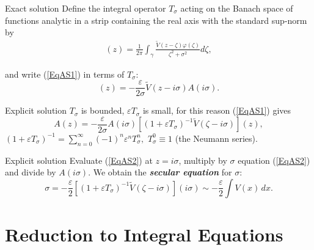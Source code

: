 \documentclass{beamer}
\begin{document}
\begin{frame}{Exact solution}
 Define the integral operator $T_\sigma$  acting on the Banach space of functions analytic in a strip containing the real axis with the standard sup-norm by
\begin{align*}
[T_\sigma \varphi(\zeta)](z)=\frac{1}{2\pi}\int_\gamma \frac{\tilde{V}(z-\zeta)\varphi(\zeta)}{\zeta^2+\sigma^2}d\zeta,
\end{align*}

 and write (\ref{EqAS1}) in terms of $T_\sigma$:
\begin{equation*} [(1+\varepsilon T_\sigma)A(\zeta)](z)=-\frac{\varepsilon}{2\sigma}\tilde{V}(z-i\sigma)A(i\sigma).\end{equation*}



\end{frame}

\begin{frame}{Explicit solution}
$T_\sigma$ is bounded,
$\varepsilon T_\sigma$ is small, for this reason (\ref{EqAS1}) gives
\begin{equation}\label{EqAS2}
A(z)=-\frac{\varepsilon}{2\sigma}A(i\sigma)[(1+\varepsilon T_{\sigma})^{-1}\tilde{V}(\zeta-i\sigma)](z),
\end{equation}
$(1+\varepsilon T_{\sigma})^{-1}=\sum_{n=0}^{\infty}(-1)^n\varepsilon^n T_\sigma^n,$ $T_\sigma^0\equiv 1$ (the Neumann series).
\end{frame}


\begin{frame}{Explicit solution}
 Evaluate (\ref{EqAS2}) at $z=i\sigma$,
multiply by $\sigma$  equation (\ref{EqAS2}) and divide by $A(i\sigma)$. We obtain the \emph{\textbf{secular equation}} for $\sigma:$
  \begin{equation}\label{eqsES}
    \sigma=-\frac{\varepsilon}{2} [(1+\varepsilon T_{\sigma})^{-1}\tilde{V}(\zeta-i\sigma)](i\sigma)\sim-\frac\varepsilon2\int V(x)\,dx.
  \end{equation}
\end{frame}

\section{Reduction to Integral Equations}
\end{document}
